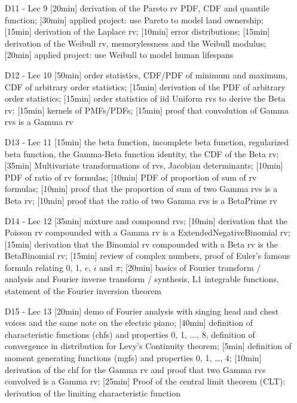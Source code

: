 \begin{enumerate}
\rule{8cm}{0.4pt} 

\item[D11 - Lec 9] [20min] derivation of the Pareto rv PDF, CDF and quantile function; [30min] applied project: use Pareto to model land ownership; [15min] derivation of the Laplace rv; [10min] error distributions; [15min] derivation of the Weibull rv, memorylessness and the Weibull modulus; [20min] applied project: use Weibull to model human lifespans

\item[D12 - Lec 10] [50min] order statistics, CDF/PDF of minimum and maximum, CDF of arbitrary order statistics; [15min] derivation of the PDF of arbitrary order statistics; [15min] order statistics of iid Uniform rvs to derive the Beta rv; [15min] kernels of PMFs/PDFs; [15min] proof that convolution of Gamma rvs is a Gamma rv

\item[D13 - Lec 11]  [15min] the beta function, incomplete beta function, regularized beta function, the Gamma-Beta function identity, the CDF of the Beta rv; [35min] Multivariate transformations of rvs, Jacobian determinants; [10min] PDF of ratio of rv formulas; [10min] PDF of proportion of sum of rv formulas; [10min] proof that the proportion of sum of two Gamma rvs is a Beta rv; [10min] proof that the ratio of two Gamma rvs is a BetaPrime rv

\item[D14 - Lec 12]  [35min] mixture and compound rvs; [10min] derivation that the Poisson rv compounded with a Gamma rv is a ExtendedNegativeBinomial rv; [15min] derivation that the Binomial rv compounded with a Beta rv is the BetaBinomial rv; [15min] review of complex numbers, proof of Euler's famous formula relating 0, 1, $e$, $i$ and $\pi$; [20min] basics of Fourier transform / analysis and Fourier inverse transform / synthesis, L1 integrable functions, statement of the Fourier inversion theorem

\item[D15 - Lec 13] [20min] demo of Fourier analysis with singing head and chest voices and the same note on the electric piano; [40min] definition of characteristic functions (chfs) and properties 0, 1, ..., 8, definition of convergence in distribution for Levy's Continuity theorem; [5min] definition of moment generating functions (mgfs) and properties 0, 1, \ldots, 4; [10min] derivation of the chf for the Gamma rv and proof that two Gamma rvs convolved is a Gamma rv; [25min] Proof of the central limit theorem (CLT): derivation of the limiting characteristic function
 


\end{enumerate}
